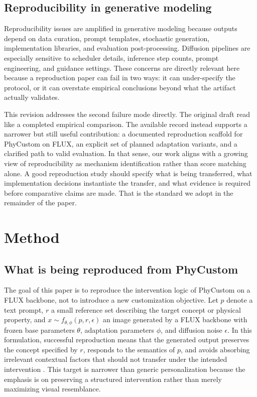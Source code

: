 \documentclass{article}
\begin{document}
\subsection{Reproducibility in generative modeling}

Reproducibility issues are amplified in generative modeling because outputs depend on data curation, prompt templates, stochastic generation, implementation libraries, and evaluation post-processing. Diffusion pipelines are especially sensitive to scheduler details, inference step counts, prompt engineering, and guidance settings. These concerns are directly relevant here because a reproduction paper can fail in two ways: it can under-specify the protocol, or it can overstate empirical conclusions beyond what the artifact actually validates.

This revision addresses the second failure mode directly. The original draft read like a completed empirical comparison. The available record instead supports a narrower but still useful contribution: a documented reproduction scaffold for PhyCustom on FLUX, an explicit set of planned adaptation variants, and a clarified path to valid evaluation. In that sense, our work aligns with a growing view of reproducibility as mechanism identification rather than score matching alone. A good reproduction study should specify what is being transferred, what implementation decisions instantiate the transfer, and what evidence is required before comparative claims are made. That is the standard we adopt in the remainder of the paper.

\section{Method}

\subsection{What is being reproduced from PhyCustom}

The goal of this paper is to reproduce the intervention logic of PhyCustom on a FLUX backbone, not to introduce a new customization objective. Let \(p\) denote a text prompt, \(r\) a small reference set describing the target concept or physical property, and \(x \sim f_{\theta,\phi}(p,r,\epsilon)\) an image generated by a FLUX backbone with frozen base parameters \(\theta\), adaptation parameters \(\phi\), and diffusion noise \(\epsilon\). In this formulation, successful reproduction means that the generated output preserves the concept specified by \(r\), responds to the semantics of \(p\), and avoids absorbing irrelevant contextual factors that should not transfer under the intended intervention \cite{wu2025phycustom,blackforestlabs2024fluxdev}. This target is narrower than generic personalization because the emphasis is on preserving a structured intervention rather than merely maximizing visual resemblance.
\end{document}
